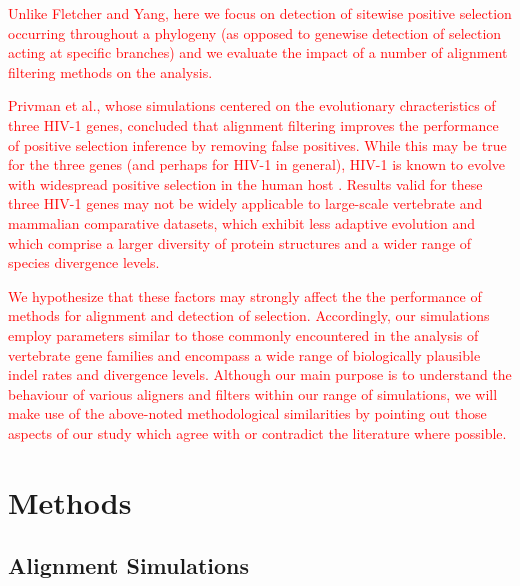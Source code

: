 \documentclass{article}
\begin{document}
\textcolor{red}{Unlike Fletcher and Yang, here we focus on \sw
  detection of sitewise positive selection occurring throughout a
  phylogeny (as opposed to genewise detection of selection acting at
  specific branches) and we evaluate the impact of a number of
  alignment filtering methods on the \sw analysis.}

\textcolor{red}{Privman et al., whose simulations centered on the
  evolutionary chracteristics of three HIV-1 genes, concluded that
  alignment filtering improves the performance of positive selection
  inference by removing false positives. While this may be true for
  the three genes (and perhaps for HIV-1 in general), HIV-1 is known
  to evolve with widespread positive selection in the human host
  \citep{Yang2003Widespread}. Results valid for these three HIV-1
  genes may not be widely applicable to large-scale vertebrate and
  mammalian comparative datasets, which exhibit less adaptive
  evolution \citep{Kosiol2008Patterns} and which comprise a larger
  diversity of protein structures and a wider range of species
  divergence levels.}

\textcolor{red}{We hypothesize that these factors may strongly affect
  the the performance of methods for alignment and detection of
  selection. Accordingly, our simulations employ parameters similar to
  those commonly encountered in the \sw analysis of vertebrate gene
  families and encompass a wide range of biologically plausible indel
  rates and divergence levels. Although our main purpose is to
  understand the behaviour of various aligners and filters within our
  range of simulations, we will make use of the above-noted
  methodological similarities by pointing out those aspects of our
  study which agree with or contradict the literature where possible.}

\section*{Methods}



\subsection*{Alignment Simulations}
\end{document}
